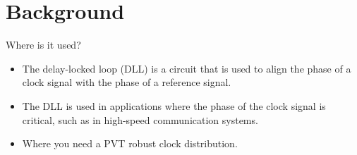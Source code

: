 \section{Background}

    \begin{frame}{Where is it used?}
        \begin{itemize}
            \item<1-> The delay-locked loop (DLL) is a circuit that is used to align the phase of a clock signal with the phase of a reference signal.
            \item<2-> The DLL is used in applications where the phase of the clock signal is critical, such as in high-speed communication systems.
            \item<3-> Where you need a \alert<3>{PVT robust} clock distribution.
        \end{itemize}
    \end{frame}